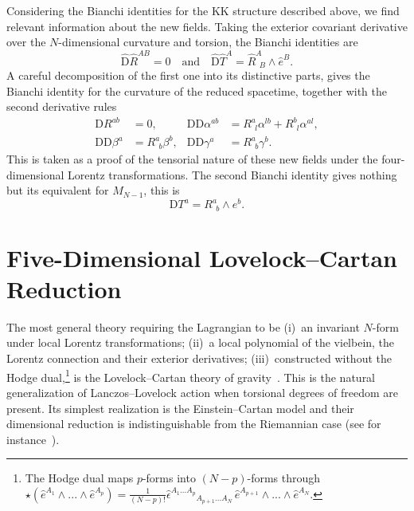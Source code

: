 \documentclass[aps,prd,12pt,superscriptaddress,showpacs,showkeys,longbibliography,reprint,nofootinbib]{revtex4-1}
\begin{document}
Considering the Bianchi identities for the KK structure described above, we find relevant information about the new fields. Taking the exterior covariant derivative over the $N$-dimensional curvature and torsion, the Bianchi identities are
\begin{equation}
  \hat{\text{D}}\hat{R}^{AB} = 0 \quad \text{and} \quad \hat{\text{D}}\hat{T}^A = \hat{R}^A_{\ \ B}\wedge\hat{e}^B.
\end{equation}
A careful decomposition of the first one into its distinctive parts, gives the Bianchi identity for the curvature of the reduced spacetime, together with the second derivative rules
\begin{equation}
  \begin{aligned}
    \text{D}R^{ab} &=0, & \text{D}\mbox{D}\alpha^{ab} &=R^a_{\ \ l}\alpha^{lb}+R^b_{\ \ l}\alpha^{al},\\
    \text{D}\text{D}\beta^a &= R^a_{\ \ b}\beta^{b}, & \text{D}\text{D}\gamma^a &= R^a_{\ \ b}\gamma^{b}.
  \end{aligned}
\end{equation}
This is taken as a proof of the tensorial nature of these new fields under the four-dimensional Lorentz transformations. The second Bianchi identity gives nothing but its equivalent for $M_{N-1}$, this is
\begin{equation*}
  \mbox{D}T^a=R^a_{\ \ b}\wedge e^b.
\end{equation*}


\section{Five-Dimensional Lovelock--Cartan Reduction\label{5EGB}}

The most general theory requiring the Lagrangian to be (i)~an invariant $N$-form under local Lorentz transformations; (ii)~a local polynomial of the vielbein, the Lorentz connection and their exterior derivatives; (iii)~constructed without the Hodge dual,\footnote{The Hodge dual maps $p$-forms into $(N-p)$-forms through $\star\left(\hat{e}^{A_1}\wedge ... \wedge\hat{e}^{A_p}\right) = \frac{1}{(N-p)!}\hat{\epsilon}^{A_1\ldots A_p}{}_{A_{p+1}...A_N}\,\hat{e}^{A_{p+1}}\wedge ... \wedge\hat{e}^{A_N}$.} is the Lovelock--Cartan theory of gravity~\cite{Mardones:1990qc}. This is the natural generalization of Lanczos--Lovelock action when torsional degrees of freedom are present. Its simplest realization is the Einstein--Cartan model and their dimensional reduction is indistinguishable from the Riemannian case (see for instance~\cite{German:1993bq,Aros:2007nn}). 
\end{document}
